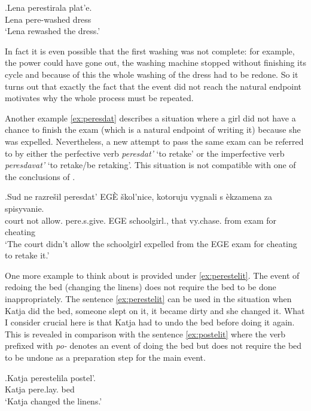 \exg.\label{ex:perestirat}Lena perestirala plat'e.\\
Lena pere-washed dress\\
\trans `Lena rewashed the dress.'

In fact it is even possible that the first washing was not complete: for example, the power could have gone out, the washing machine stopped without finishing its cycle and because of this the whole washing of the dress had to be redone. So it turns out that exactly the fact that the event did not reach the natural endpoint motivates why the whole process must be repeated.

Another example \ref{ex:peresdat} describes a situation where a girl did not have a chance to finish the exam (which is a natural endpoint of writing it) because she was expelled. Nevertheless, a new attempt to pass the same exam can be referred to by either the perfective verb \textit{peresdat'} `to retake' or the imperfective verb \textit{peresdavat'} `to retake/be retaking'. This situation is not compatible with one of the conclusions of \citet{Kagan:book}.

\exg.\label{ex:peresdat}Sud ne razre\v{s}il peresdat' EG\`{E} \v{s}kol'nice, kotoruju vygnali s \`{e}kzamena za spisyvanie.\\
court not allow. pere.s.give. EGE schoolgirl., that vy.chase. from exam for cheating\\
\trans `The court didn't allow the schoolgirl expelled from the EGE exam for cheating to retake it.'

One more example to think about is provided under \ref{ex:perestelit}. The event of redoing the bed (changing the linens) does not require the bed to be done inappropriately. The sentence \ref{ex:perestelit} can be used in the situation when Katja did the bed, someone slept on it, it became dirty and she changed it. What I consider crucial here is that Katja had to undo the bed before doing it again. This is revealed in comparison with the sentence \ref{ex:postelit} where the verb prefixed with \textit{po-} denotes an event of doing the bed but does not require the bed to be undone as a preparation step for the main event. 

\exg.\label{ex:perestelit}Katja perestelila postel'.\\
Katja pere.lay. bed\\
\trans `Katja changed the linens.'

